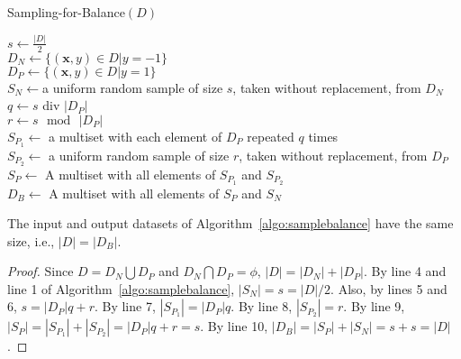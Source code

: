\begin{algorithm}
\vspace{-2pt}
\caption{{\sf Sampling-for-Balance}$(D)$}
\label{algo:samplebalance}


$s \gets \frac{|D|}{2}$\\
$D_N \gets \{(\mathbf{x},y) \in D|y = -1\}$\\ 
$D_P \gets \{(\mathbf{x},y) \in D|y = 1\}$\\
$S_N \gets $a uniform random sample of size $s$, taken without replacement, from $D_N$\\
$q \gets s$ div $|D_P|$\\
$r \gets s \,\bmod\, |D_P|$\\
$S_{P_1} \gets$ a multiset with each element of $D_P$ repeated $q$ times\\
$S_{P_2} \gets$ a uniform random sample of size $r$, taken without replacement, from $D_P$\\
$S_P \gets $ A multiset with all elements of $S_{P_1}$ and $S_{P_2}$\\
$D_B \gets $ A multiset with all elements of $S_P$ and $S_N$
\end{algorithm}

\begin{theorem}
The input and output datasets of Algorithm~\ref{algo:samplebalance} have the same size, i.e., $|D|= |D_B|$.
\end{theorem}
\begin{proof}
Since $D = D_N \bigcup D_P$ and $D_N \bigcap D_P = \phi$, $|D| = |D_N| + |D_P|$. By line 4 and line 1 of Algorithm~\ref{algo:samplebalance}, $|S_N| = s = |D|/2$. Also, by lines 5 and 6, $s = |D_P|q + r$. By line 7, $|S_{P_1}| = |D_P|q$. By line 8, $|S_{P_2}| = r$. By line 9, $|S_P| = |S_{P_1}| + |S_{P_2}| = |D_P|q + r = s$. By line 10, $|D_B| = |S_P| + |S_N| = s + s = |D|$.
\end{proof}
  
